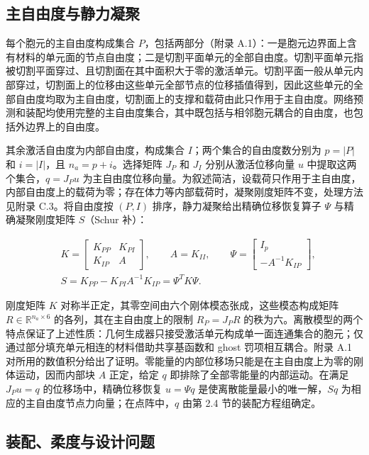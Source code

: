 \documentclass[preprint,12pt,authoryear]{elsarticle}
\begin{document}
\subsection{主自由度与静力凝聚}

每个胞元的主自由度构成集合 \(P\)，包括两部分（附录 A.1）：一是胞元边界面上含有材料的单元面的节点自由度；二是切割平面单元的全部自由度。切割平面单元指被切割平面穿过、且切割面在其中面积大于零的激活单元。切割平面一般从单元内部穿过，切割面上的位移由这些单元全部节点的位移插值得到，因此这些单元的全部自由度均取为主自由度，切割面上的支撑和载荷由此只作用于主自由度。网络预测和装配均使用完整的主自由度集合，其中既包括与相邻胞元耦合的自由度，也包括外边界上的自由度。

其余激活自由度为内部自由度，构成集合 \(I\)；两个集合的自由度数分别为 \(p=|P|\) 和 \(i=|I|\)，且 \(n_a=p+i\)。选择矩阵 \(J_P\) 和 \(J_I\) 分别从激活位移向量 \(u\) 中提取这两个集合，\(q=J_Pu\) 为主自由度位移向量。为叙述简洁，设载荷只作用于主自由度，内部自由度上的载荷为零；存在体力等内部载荷时，凝聚刚度矩阵不变，处理方法见附录 C.3。将自由度按 \((P,I)\) 排序，静力凝聚给出精确位移恢复算子 \(\Psi\) 与精确凝聚刚度矩阵 \(S\)（Schur 补）：

\[
\begin{aligned}
&K=\begin{bmatrix}K_{PP}&K_{PI}\\K_{IP}&A\end{bmatrix},\qquad
A=K_{II},\qquad
\Psi=\begin{bmatrix}I_p\\-A^{-1}K_{IP}\end{bmatrix},\\
&S=K_{PP}-K_{PI}A^{-1}K_{IP}=\Psi^TK\Psi.
\end{aligned}
\tag{2}
\]

刚度矩阵 \(K\) 对称半正定，其零空间由六个刚体模态张成，这些模态构成矩阵 \(R\in\mathbb R^{n_a\times6}\) 的各列，其在主自由度上的限制 \(R_P=J_PR\) 的秩为六。离散模型的两个特点保证了上述性质：几何生成器只接受激活单元构成单一面连通集合的胞元；仅通过部分填充单元相连的材料借助共享基函数和 ghost 罚项相互耦合。附录 A.1 对所用的数值积分给出了证明。零能量的内部位移场只能是在主自由度上为零的刚体运动，因而内部块 \(A\) 正定，给定 \(q\) 即排除了全部零能量的内部运动。在满足 \(J_Pu=q\) 的位移场中，精确位移恢复 \(u=\Psi q\) 是使离散能量最小的唯一解，\(Sq\) 为相应的主自由度节点力向量；在点阵中，\(q\) 由第 2.4 节的装配方程组确定。

\subsection{装配、柔度与设计问题}
\end{document}
